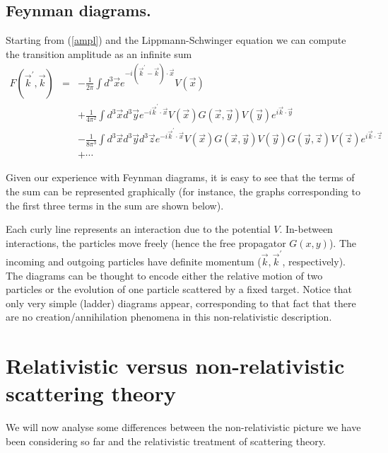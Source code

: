 \documentclass[11pt]{article}
\def\p{\pi}
\newcommand{\vk}{{\vec{k}}}
\newcommand{\vy}{{\vec{y}}}
\newcommand{\vz}{{\vec{z}}}
\newcommand{\vx}{{\vec{x}}}
\begin{document}
\subsection{Feynman diagrams.}
Starting from (\ref{ampl}) and the Lippmann-Schwinger equation we can compute
the transition amplitude as an infinite sum
\begin{eqnarray*}
F(\vk^\prime ,\vk ) & = & -\frac{1}{2\p }\int d^3 \vx e^{-i (\vk^\prime -\vk )
			 \cdot\vx} V(\vx ) \\
		   &   & +\frac{1}{4\p^2} \int d^3 \vx d^3 \vy e^{-i\vk^\prime\cdot
			 \vx} V(\vx) G(\vx, \vy )V(\vy) e^{i\vk\cdot\vy} \\
		   &   & -\frac{1}{8\p^3} \int d^3 \vx d^3 \vy d^3 \vz
			 e^{-i\vk^\prime\cdot\vx} V(\vx) G(\vx, \vy )V(\vy)
			 G(\vy, \vz )V(\vz) e^{i\vk\cdot\vz} \\
		   &   & +\cdots
\end{eqnarray*}

Given our experience with Feynman diagrams, it is easy to see that the terms of the sum
can be represented graphically (for instance, the graphs corresponding to the
first three terms in the sum are shown below).

\begin{center}


\end{center}

Each curly line represents an interaction due to the potential $V$. In-between
interactions, the particles move freely (hence the free propagator
$G(x,y)$). The incoming and outgoing particles have definite momentum
($\vk, \vk^\prime $, respectively). The diagrams can be thought to encode
either the relative motion of two particles or the evolution of one
particle scattered by a fixed target. Notice that only very simple
(ladder) diagrams appear, corresponding to that fact that there
are no creation/annihilation phenomena in this non-relativistic
description.

\section{Relativistic versus non-relativistic scattering theory}

We will now analyse some differences between the non-relativistic
picture we have been considering so far and the 
relativistic treatment of scattering theory. 
\end{document}
